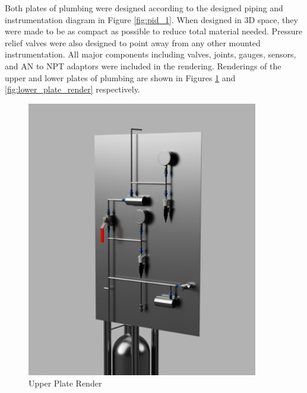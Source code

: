 \documentclass[9pt]{article} %
\numberwithin{equation}{section} %
\begin{document}
\hspace{\parindent} Both plates of plumbing were designed according to the designed piping and instrumentation diagram in Figure \ref{fig:pid_1}. When designed in 3D space, they were made to be as compact as possible to reduce total material needed. Pressure relief valves were also designed to point away from any other mounted instrumentation. All major components including valves, joints, gauges, sensors, and AN to NPT adaptors were included in the rendering. Renderings of the upper and lower plates of plumbing are shown in Figures \ref{fig:upper_plate_render} and \ref{fig:lower_plate_render} respectively.
\begin{figure}[!htb]
    \centering
    \begin{minipage}{0.49\textwidth}
        \centering
        \includegraphics[scale=0.5, width=0.9\textwidth]{upper_plate.png} %
        \caption{Upper Plate Render}
        \label{fig:upper_plate_render}
    \end{minipage}\hfill
    \begin{minipage}{0.49\textwidth}
        \centering

\end{minipage}
\end{figure}
\end{document}
